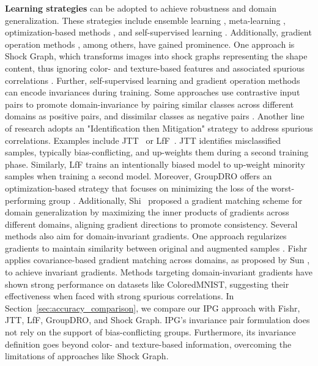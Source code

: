 \textbf{Learning strategies} can be adopted to achieve robustness and domain generalization. 
These strategies include ensemble learning \cite{wu_collaborative_2021, nam_learning_2020}, meta-learning \cite{zhao_learning_2021, qiao_uncertainty-guided_2021}, optimization-based methods \cite{sagawa_distributionally_2020}, and self-supervised learning \cite{kim_selfreg_2021, carlucci_domain_2019}.
Additionally, gradient operation methods \cite{shi_gradient_2022, tian_neuron_2023}, among others, have gained prominence. 
One approach is Shock Graph, which transforms images into shock graphs representing the shape content, thus ignoring color- and texture-based features and associated spurious correlations \cite{narayanan_shape-biased_2021}.
%
Further, self-supervised learning and gradient operation methods can encode invariances during training. 
Some approaches use contrastive input pairs to promote domain-invariance by pairing similar classes across different domains as positive pairs, and dissimilar classes as negative pairs \cite{kim_selfreg_2021, jeon_feature_2021}.
Another line of research adopts an "Identification then Mitigation" strategy to address spurious correlations.
Examples include JTT~\cite{liu_just_2021} or LfF~\cite{nam_learning_2020}.
JTT identifies misclassified samples, typically bias-conflicting, and up-weights them during a second training phase.
Similarly, LfF trains an intentionally biased model to up-weight minority samples when training a second model.
Moreover, GroupDRO offers an optimization-based strategy that focuses on minimizing the loss of the worst-performing group \cite{sagawa_distributionally_2020}.
Additionally, Shi~\cite{shi_gradient_2022} proposed a gradient matching scheme for domain generalization by maximizing the inner products of gradients across different domains, aligning gradient directions to promote consistency.
%
Several methods also aim for domain-invariant gradients.
One approach regularizes gradients to maintain similarity between original and augmented samples \cite{tian_neuron_2023}. 
Fishr \cite{rame_fishr_2022} applies covariance-based gradient matching across domains, as proposed by Sun \cite{sun_return_2016}, to achieve invariant gradients.
Methods targeting domain-invariant gradients have shown strong performance on datasets like ColoredMNIST, suggesting their effectiveness when faced with strong spurious correlations. 
In Section~\ref{sec:accuracy_comparison}, we compare our IPG approach with Fishr, JTT, LfF, GroupDRO, and Shock Graph.
IPG's invariance pair formulation does not rely on the support of bias-conflicting groups. 
Furthermore, its invariance definition goes beyond color- and texture-based information, overcoming the limitations of approaches like Shock Graph.